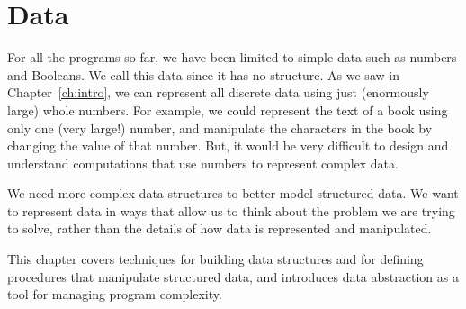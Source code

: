 
\chapter{Data}\label{ch:data}



For all the programs so far, we have been limited to simple data such as numbers and Booleans.  We call this  data since it has no structure.  As we saw in Chapter~\ref{ch:intro}, we can represent all discrete data using just (enormously large) whole numbers.  For example, we could represent the text of a book using only one (very large!) number, and manipulate the characters in the book by changing the value of that number.  But, it would be very difficult to design and understand computations that use numbers to represent complex data.  

We need more complex data structures to better model structured data.  We want to represent data in ways that allow us to think about the problem we are trying to solve, rather than the details of how data is represented and manipulated.  

This chapter covers techniques for building data structures and for defining procedures that manipulate structured data, and introduces data abstraction as a tool for managing program complexity. 


